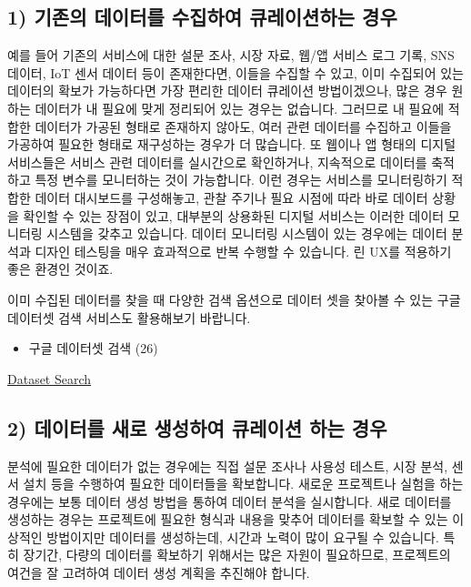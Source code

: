\documentclass[
  letterpaper,
]{book}
\providecommand{\tightlist}{%
  \setlength{\itemsep}{0pt}\setlength{\parskip}{0pt}}\usepackage{longtable,booktabs,array}
\begin{document}
\subsection{1) 기존의 데이터를 수집하여 큐레이션하는
경우}\label{uxae30uxc874uxc758-uxb370uxc774uxd130uxb97c-uxc218uxc9d1uxd558uxc5ec-uxd050uxb808uxc774uxc158uxd558uxb294-uxacbduxc6b0}

예를 들어 기존의 서비스에 대한 설문 조사, 시장 자료, 웹/앱 서비스 로그
기록, SNS 데이터, IoT 센서 데이터 등이 존재한다면, 이들을 수집할 수
있고, 이미 수집되어 있는 데이터의 확보가 가능하다면 가장 편리한 데이터
큐레이션 방법이겠으나, 많은 경우 원하는 데이터가 내 필요에 맞게 정리되어
있는 경우는 없습니다. 그러므로 내 필요에 적합한 데이터가 가공된 형태로
존재하지 않아도, 여러 관련 데이터를 수집하고 이들을 가공하여 필요한
형태로 재구성하는 경우가 더 많습니다. 또 웹이나 앱 형태의 디지털
서비스들은 서비스 관련 데이터를 실시간으로 확인하거나, 지속적으로
데이터를 축적하고 특정 변수를 모니터하는 것이 가능합니다. 이런 경우는
서비스를 모니터링하기 적합한 데이터 대시보드를 구성해놓고, 관찰 주기나
필요 시점에 따라 바로 데이터 상황을 확인할 수 있는 장점이 있고, 대부분의
상용화된 디지털 서비스는 이러한 데이터 모니터링 시스템을 갖추고
있습니다. 데이터 모니터링 시스템이 있는 경우에는 데이터 분석과 디자인
테스팅을 매우 효과적으로 반복 수행할 수 있습니다. 린 UX를 적용하기 좋은
환경인 것이죠.

이미 수집된 데이터를 찾을 때 다양한 검색 옵션으로 데이터 셋을 찾아볼 수
있는 구글 데이터셋 검색 서비스도 활용해보기 바랍니다.

\begin{itemize}
\tightlist
\item
  구글 데이터셋 검색 (26)
\end{itemize}

\href{https://datasetsearch.research.google.com}{Dataset Search}

\subsection{2) 데이터를 새로 생성하여 큐레이션 하는
경우}\label{uxb370uxc774uxd130uxb97c-uxc0c8uxb85c-uxc0dduxc131uxd558uxc5ec-uxd050uxb808uxc774uxc158-uxd558uxb294-uxacbduxc6b0}

분석에 필요한 데이터가 없는 경우에는 직접 설문 조사나 사용성 테스트,
시장 분석, 센서 설치 등을 수행하여 필요한 데이터들을 확보합니다. 새로운
프로젝트나 실험을 하는 경우에는 보통 데이터 생성 방법을 통하여 데이터
분석을 실시합니다. 새로 데이터를 생성하는 경우는 프로젝트에 필요한
형식과 내용을 맞추어 데이터를 확보할 수 있는 이상적인 방법이지만
데이터를 생성하는데, 시간과 노력이 많이 요구될 수 있습니다. 특히 장기간,
다량의 데이터를 확보하기 위해서는 많은 자원이 필요하므로, 프로젝트의
여건을 잘 고려하여 데이터 생성 계획을 추진해야 합니다.
\end{document}
